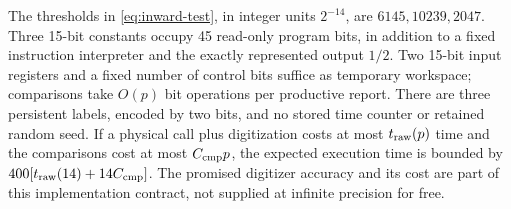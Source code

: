 The thresholds in \eqref{eq:inward-test}, in integer units $2^{-14}$, are $6145,10239,2047$. Three 15-bit constants occupy 45 read-only program bits, in addition to a fixed instruction interpreter and the exactly represented output $1/2$. Two 15-bit input registers and a fixed number of control bits suffice as temporary workspace; comparisons take $O(p)$ bit operations per productive report. There are three persistent labels, encoded by two bits, and no stored time counter or retained random seed. If a physical call plus digitization costs at most $t_{\rm raw}(p)$ time and the comparisons cost at most $C_{\rm cmp}p$, the expected execution time is bounded by $400[t_{\rm raw}(14)+14C_{\rm cmp}]$. The promised digitizer accuracy and its cost are part of this implementation contract, not supplied at infinite precision for free.
